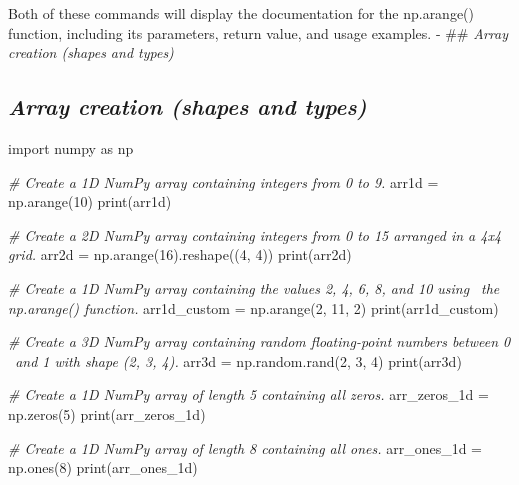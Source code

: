 \documentclass[11pt]{article}
\newenvironment{Shaded}{}{}
\newcommand{\DecValTok}[1]{\textcolor[rgb]{0.25,0.63,0.44}{{#1}}}
\newcommand{\CommentTok}[1]{\textcolor[rgb]{0.38,0.63,0.69}{\textit{{#1}}}}
\newcommand{\NormalTok}[1]{{#1}}
\newcommand{\ImportTok}[1]{{#1}}
\newcommand{\OperatorTok}[1]{\textcolor[rgb]{0.40,0.40,0.40}{{#1}}}
\newcommand{\BuiltInTok}[1]{{#1}}
\begin{document}
Both of these commands will display the documentation for the
np.arange() function, including its parameters, return value, and usage
examples. - \#\# \emph{Array creation (shapes and types)}
\hypertarget{array-creation-shapes-and-types}{%
\subsection{\texorpdfstring{\emph{Array creation (shapes and
types)}}{Array creation (shapes and types)}}\label{array-creation-shapes-and-types}}
\begin{Shaded}
\begin{tcolorbox}[breakable, size=fbox, boxrule=1pt, pad at break*=1mm,colback=cellbackground, colframe=cellborder]
  \begin{Highlighting}[]
\ImportTok{import}\NormalTok{ numpy }\ImportTok{as}\NormalTok{ np}

\CommentTok{\# Create a 1D NumPy array containing integers from 0 to 9.}
\NormalTok{arr1d }\OperatorTok{=}\NormalTok{ np.arange(}\DecValTok{10}\NormalTok{)}
\BuiltInTok{print}\NormalTok{(arr1d)}

\CommentTok{\# Create a 2D NumPy array containing integers from 0 to 15 arranged in a 4x4 grid.}
\NormalTok{arr2d }\OperatorTok{=}\NormalTok{ np.arange(}\DecValTok{16}\NormalTok{).reshape((}\DecValTok{4}\NormalTok{, }\DecValTok{4}\NormalTok{))}
\BuiltInTok{print}\NormalTok{(arr2d)}

\CommentTok{\# Create a 1D NumPy array containing the values 2, 4, 6, 8, and 10 using}
\CommentTok{\ the np.arange() function.}
\NormalTok{arr1d\_custom }\OperatorTok{=}\NormalTok{ np.arange(}\DecValTok{2}\NormalTok{, }\DecValTok{11}\NormalTok{, }\DecValTok{2}\NormalTok{)}
\BuiltInTok{print}\NormalTok{(arr1d\_custom)}

\CommentTok{\# Create a 3D NumPy array containing random floating{-}point numbers between 0}
\CommentTok{\  and 1 with shape (2, 3, 4).}
\NormalTok{arr3d }\OperatorTok{=}\NormalTok{ np.random.rand(}\DecValTok{2}\NormalTok{, }\DecValTok{3}\NormalTok{, }\DecValTok{4}\NormalTok{)}
\BuiltInTok{print}\NormalTok{(arr3d)}

\CommentTok{\# Create a 1D NumPy array of length 5 containing all zeros.}
\NormalTok{arr\_zeros\_1d }\OperatorTok{=}\NormalTok{ np.zeros(}\DecValTok{5}\NormalTok{)}
\BuiltInTok{print}\NormalTok{(arr\_zeros\_1d)}

\CommentTok{\# Create a 1D NumPy array of length 8 containing all ones.}
\NormalTok{arr\_ones\_1d }\OperatorTok{=}\NormalTok{ np.ones(}\DecValTok{8}\NormalTok{)}
\BuiltInTok{print}\NormalTok{(arr\_ones\_1d)}


\end{Highlighting}
\end{tcolorbox}
\end{Shaded}
\end{document}
